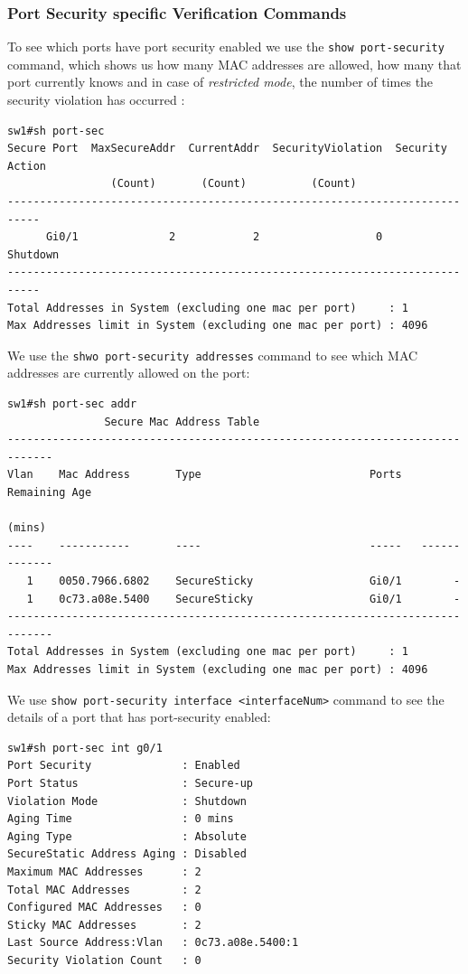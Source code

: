 \subsubsection{Port Security specific Verification Commands}
To see which ports have port security enabled we use the \verb|show port-security| command, which shows us how many MAC addresses are allowed, how many that port currently knows and in case of \textit{restricted mode}, the number of times the security violation has occurred :

\vspace{-15pt}
\begin{verbatim}
sw1#sh port-sec
Secure Port  MaxSecureAddr  CurrentAddr  SecurityViolation  Security Action
                (Count)       (Count)          (Count)
---------------------------------------------------------------------------
      Gi0/1              2            2                  0         Shutdown
---------------------------------------------------------------------------
Total Addresses in System (excluding one mac per port)     : 1
Max Addresses limit in System (excluding one mac per port) : 4096
\end{verbatim}
\vspace{-10pt}

\noindent
We use the \verb|shwo port-security addresses| command to see which MAC addresses are currently allowed on the port:

\vspace{-15pt}
\begin{verbatim}
sw1#sh port-sec addr
               Secure Mac Address Table
-----------------------------------------------------------------------------
Vlan    Mac Address       Type                          Ports   Remaining Age
                                                                   (mins)
----    -----------       ----                          -----   -------------
   1    0050.7966.6802    SecureSticky                  Gi0/1        -
   1    0c73.a08e.5400    SecureSticky                  Gi0/1        -
-----------------------------------------------------------------------------
Total Addresses in System (excluding one mac per port)     : 1
Max Addresses limit in System (excluding one mac per port) : 4096
\end{verbatim}
\vspace{-10pt}

\noindent
We use \verb|show port-security interface <interfaceNum>| command to see the details of a port that has port-security enabled:
\vspace{-15pt}
\begin{verbatim}
sw1#sh port-sec int g0/1
Port Security              : Enabled
Port Status                : Secure-up
Violation Mode             : Shutdown
Aging Time                 : 0 mins
Aging Type                 : Absolute
SecureStatic Address Aging : Disabled
Maximum MAC Addresses      : 2
Total MAC Addresses        : 2
Configured MAC Addresses   : 0
Sticky MAC Addresses       : 2
Last Source Address:Vlan   : 0c73.a08e.5400:1
Security Violation Count   : 0
\end{verbatim}
\vspace{-10pt}

